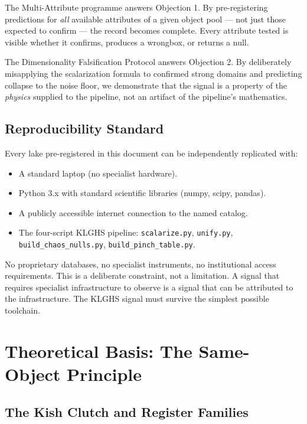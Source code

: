\documentclass[12pt,a4paper]{article}
\begin{document}
The Multi-Attribute programme answers Objection 1. By pre-registering
predictions for \emph{all} available attributes of a given object pool --- not
just those expected to confirm --- the record becomes complete. Every attribute
tested is visible whether it confirms, produces a wrongbox, or returns a null.

The Dimensionality Falsification Protocol answers Objection 2. By deliberately
misapplying the scalarization formula to confirmed strong domains and predicting
collapse to the noise floor, we demonstrate that the signal is a property of
the \emph{physics} supplied to the pipeline, not an artifact of the
pipeline's mathematics.

\subsection{Reproducibility Standard}

Every lake pre-registered in this document can be independently replicated with:
\begin{itemize}
  \item A standard laptop (no specialist hardware).
  \item Python 3.x with standard scientific libraries (numpy, scipy, pandas).
  \item A publicly accessible internet connection to the named catalog.
  \item The four-script KLGHS pipeline: \texttt{scalarize.py}, \texttt{unify.py},
        \texttt{build\_chaos\_nulls.py}, \texttt{build\_pinch\_table.py}.
\end{itemize}
No proprietary databases, no specialist instruments, no institutional access
requirements. This is a deliberate constraint, not a limitation. A signal
that requires specialist infrastructure to observe is a signal that can be
attributed to the infrastructure. The KLGHS signal must survive the simplest
possible toolchain.

\section{Theoretical Basis: The Same-Object Principle}
\label{sec:same_object}

\subsection{The Kish Clutch and Register Families}
\end{document}
